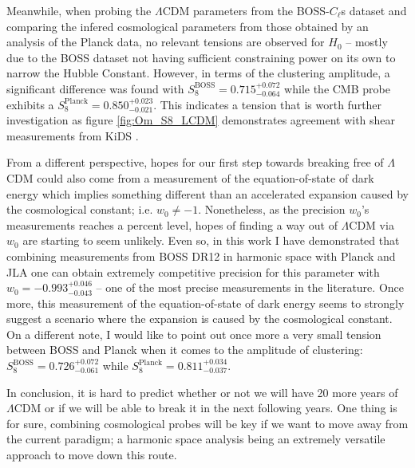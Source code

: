 \qquad Meanwhile, when probing the $\Lambda$CDM parameters from the BOSS-$C_{\ell}$s dataset and comparing the infered cosmological parameters from those obtained by an analysis of the Planck data, no relevant tensions are observed for $H_0$ -- mostly due to the BOSS dataset not having sufficient constraining power on its own to narrow the Hubble Constant. However, in terms of the clustering amplitude, a significant difference was found with $S_8^{\text{BOSS}} = 0.715^{+0.072}_{-0.064}$ while the CMB probe exhibits a $S_8^{\text{Planck}} = 0.850^{+0.023}_{-0.021}$. This indicates a tension that is worth further investigation as figure \ref{fig:Om_S8_LCDM} demonstrates agreement with shear measurements from KiDS \citep{2017MNRAS.465.1454H}.

\qquad From a different perspective, hopes for our first step towards breaking free of $\Lambda$CDM could also come from a measurement of the equation-of-state of dark energy which implies something different than an accelerated expansion caused by the cosmological constant; i.e. $w_0 \neq -1$. Nonetheless, as the precision $w_0$'s measurements reaches a percent level, hopes of finding a way out of $\Lambda$CDM via $w_0$ are starting to seem unlikely. Even so, in this work I have demonstrated that combining measurements from BOSS DR12 in harmonic space with Planck and JLA one can obtain extremely competitive precision for this parameter with $w_0 = -0.993^{+0.046}_{-0.043}$ -- one of the most precise measurements in the literature. Once more,  this measurement of the equation-of-state of dark energy seems to strongly suggest a scenario where the expansion is caused by the cosmological constant. On a different note, I would like to point out once more a very small tension between BOSS and Planck when it comes to the amplitude of clustering: $S_8^{\text{BOSS}} = 0.726_{-0.061}^{+0.072}$ while $S_8^{\text{Planck}} = 0.811_{-0.037}^{+0.034}$.

\qquad In conclusion, it is hard to predict whether or not we will have 20 more years of $\Lambda$CDM or if we will be able to break it in the next following years. One thing is for sure, combining cosmological probes will be key if we want to move away from the current paradigm; a harmonic space analysis being an extremely versatile approach to move down this route.


